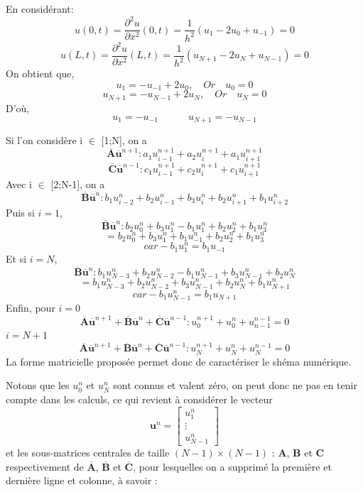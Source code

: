 \documentclass[a4,12pt]{article}
\newcommand{\A}{\mathbf{A}}
\newcommand{\B}{\mathbf{B}}
\newcommand{\C}{\mathbf{C}}
\newcommand{\ub}{\mathbf{u}}
\begin{document}
\newpage
\begin{mdframed}[style=exempledefault,backgroundcolor=green!60]

En considérant:
\[
    u(0,t)=\frac{\partial ^2u}{\partial x^2}(0,t)=\frac{1}{h^2}(u_{1}-2u_{0}+u_{-1})=0
\]
\[
    u(L,t)=\frac{\partial ^2u}{\partial x^2}(L,t)=\frac{1}{h^2}(u_{N+1}-2u_{N}+u_{N-1})=0
\]
On obtient que,
\[
    u_{1}=-u_{-1}+2u_{0}, \quad Or \quad u_{0}=0
\]
\[
    u_{N+1}=-u_{N-1}+2u_{N}, \quad Or \quad u_{N}=0
\]
D'où,
\[
    u_{1}=-u_{-1} \quad\quad\quad u_{N+1}=-u_{N-1}
\]

Si l'on considère i $\in$ [1;N], on a
\[
    \overline{\A}\overline{\ub}^{n+1}: a_{1}u_{i-1}^{n+1}+a_{2}u_{i}^{n+1}+a_{1}u_{i+1}^{n+1}
\]
\[
   \overline{\C}\overline{\ub}^{n-1}: c_{1}u_{i-1}^{n+1}+c_{2}u_{i}^{n+1}+c_{1}u_{i+1}^{n+1}
\]
Avec i $\in$ [2;N-1], on a 
\[
    \overline{\B}\overline{\ub}^n: b_{1}u_{i-2}^n+b_{2}u_{i-1}^n+b_{3}u_{i}^n+b_{2}u_{i+1}^n+b_{1}u_{i+2}^n
\]
Puis si $i=1$,
\[
    \overline{\B}\overline{\ub}^n: b_{2}u_{0}^n+b_{3}u_{1}^n-b_{1}u_{1}^n+b_{2}u_{2}^n+b_{1}u_{3}^n
\]
\[
    = b_{2}u_{0}^n+b_{3}u_{1}^n+b_{1}u_{-1}^n+b_{2}u_{2}^n+b_{1}u_{3}^n
\]
\[
    car -b_{1}u_{1}^n=b_{1}u_{-1}
\]
Et si $i=N$,
\[
    \overline{\B}\overline{\ub}^n: b_{1}u_{N-3}^n+b_{2}u_{N-2}^n-b_{1}u_{N-1}^n+b_{3}u_{N-1}^n+b_{2}u_{N}^n
\]
\[
    = b_{1}u_{N-3}^n+b_{2}u_{N-2}^n+b_{3}u_{N-1}^n+b_{2}u_{N}^n+b_{1}u_{N+1}^n
\]
\[
    car -b_{1}u_{N-1}^n=b_{1}u_{N+1}
\]
Enfin, pour $i=0$
\[
	\overline{\A} \overline{\ub}^{n+1}+\overline{\B} \overline{\ub}^n+\overline{\C} \overline{\ub}^{n-1}: u_{0}^{n+1}+u_{0}^{n}+u_{n-1}^{n-1}=0
\]
$i=N+1$
\[
	\overline{\A} \overline{\ub}^{n+1}+\overline{\B} \overline{\ub}^n+\overline{\C} \overline{\ub}^{n-1}: u_{N}^{n+1}+u_{N}^{n}+u_{N}^{n-1}=0
\]
La forme matricielle proposée permet donc de caractériser le shéma numérique.
\end{mdframed}


Notons que les $u_0^n$ et $u_{N}^n$ sont connus et valent zéro, on peut donc ne pas en tenir compte dans les calculs, ce qui revient à considérer le vecteur 
\[
\ub^n=\begin{bmatrix}u_1^n\\ \vdots \\ u_{N-1}^n\end{bmatrix}
\]
et les sous-matrices centrales de taille $(N-1)\times (N-1)$ : $\A$, $\B$ et $\C$ respectivement de $\overline{\A}$, $\overline{\B}$ et $\overline{\C}$, pour lesquelles on a supprimé la première et dernière ligne et colonne, à savoir :
\end{document}
